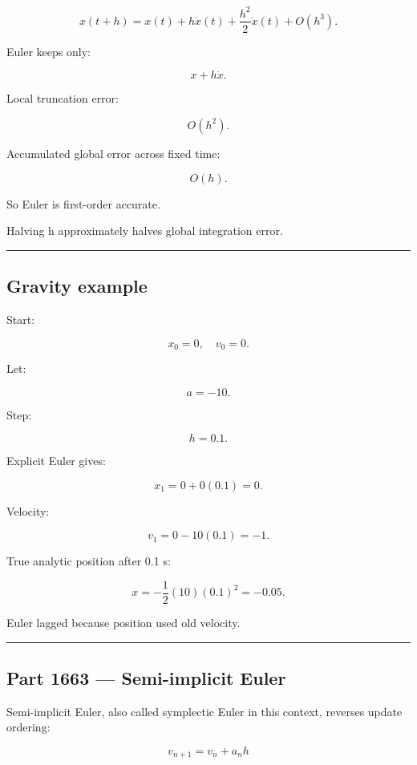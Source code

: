\[
x(t+h)
=
x(t)
+
h\dot x(t)
+
\frac{h^2}{2}\ddot x(t)
+
O(h^3).
\]

Euler keeps only:

\[
x+h\dot x.
\]

Local truncation error:

\[
O(h^2).
\]

Accumulated global error across fixed time:

\[
\boxed{
O(h).
}
\]

So Euler is first-order accurate.

Halving h approximately halves global integration error.

\begin{center}\rule{0.5\linewidth}{0.5pt}\end{center}

\subsection{Gravity example}\label{06-engine-ii-ch037-gravity-example}

Start:

\[
x_0=0,\quad v_0=0.
\]

Let:

\[
a=-10.
\]

Step:

\[
h=0.1.
\]

Explicit Euler gives:

\[
x_1
=
0+0(0.1)
=
0.
\]

Velocity:

\[
v_1
=
0-10(0.1)
=
-1.
\]

True analytic position after 0.1 s:

\[
x=-\frac12(10)(0.1)^2=-0.05.
\]

Euler lagged because position used old velocity.

\begin{center}\rule{0.5\linewidth}{0.5pt}\end{center}

\subsection{Part 1663 --- Semi-implicit Euler}\label{06-engine-ii-ch037-part-1663-semi-implicit-euler}

Semi-implicit Euler, also called symplectic Euler in this context, reverses update ordering:

\[
\boxed{
v_{n+1}
=
v_n+a_nh
}
\]

